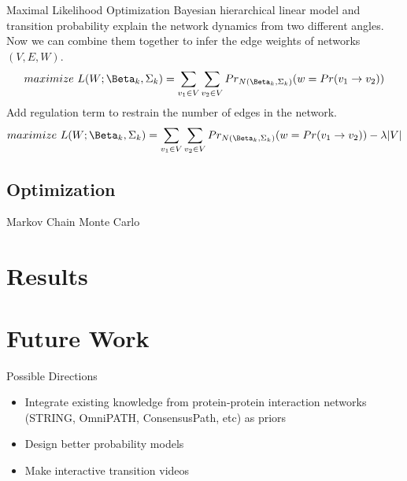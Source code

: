 \documentclass[handout,t]{beamer}
\begin{document}
\begin{frame}{Maximal Likelihood Optimization}
Bayesian hierarchical linear model and transition probability explain the network dynamics from two different angles. Now we can combine them together to infer the edge weights of networks $(V, E, W)$.
\begin{equation}
   maximize\ L(W; \Beta_k, \Sigma_k) = \sum_{v_1\in V} \sum_{v_2\in V} Pr_{N(\Beta_k, \Sigma_k)} (w=Pr(v_1\rightarrow v_2))
\end{equation}
Add regulation term to restrain the number of edges in the network.
\begin{equation}
   maximize\ L(W; \Beta_k, \Sigma_k) = \sum_{v_1\in V} \sum_{v_2\in V} Pr_{N(\Beta_k, \Sigma_k)} (w=Pr(v_1\rightarrow v_2)) - \lambda |V|
\end{equation}
\end{frame}


\subsection{Optimization}
\begin{frame}{Markov Chain Monte Carlo}

\end{frame}




\section{Results}










\section{Future Work}

\begin{frame}{Possible Directions}
\begin{itemize}
\item Integrate existing knowledge from protein-protein interaction networks (STRING, OmniPATH, ConsensusPath, etc) as priors
\item Design better probability models
\item Make interactive transition videos
\end{itemize}
\end{frame}
\end{document}
